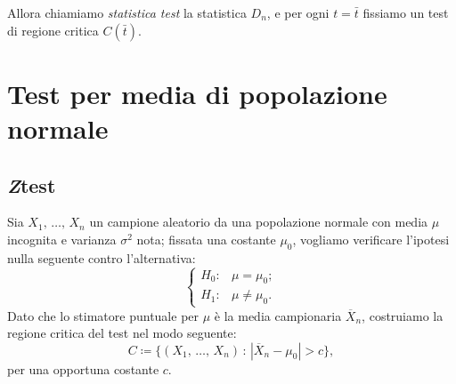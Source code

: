             Allora chiamiamo \emph{statistica test} la statistica $D_n$, e per ogni $t = \bar{t}$ fissiamo 
            un test di regione critica $C(\bar{t})$.
    \section{Test per media di popolazione normale}
        \subsection{\emph{Z}\nbdash test}
            \begin{defn}[Bilatero]
                Sia $X_1,\, \ldots,\, X_{n}$ un campione aleatorio da una popolazione normale con media $\mu$ 
                incognita e varianza $\sigma^2$ nota; fissata una costante $\mu_0$, vogliamo verificare 
                l'ipotesi nulla seguente contro l'alternativa: \[
                \begin{cases}
                    H_0 : & \mu = \mu_0; \\
                    H_1 : & \mu \neq \mu_0.
                \end{cases}
                \] Dato che lo stimatore puntuale per $\mu$ è la media campionaria $\overline{X}_n$, costruiamo 
                la regione critica del test nel modo seguente: \[
                    C \coloneqq \big\{(X_1,\, \ldots,\, X_{n}) \,:\, |\overline{X}_n -\mu_0| > c\big\}
                ,\] per una opportuna costante $c$.


\end{defn}
